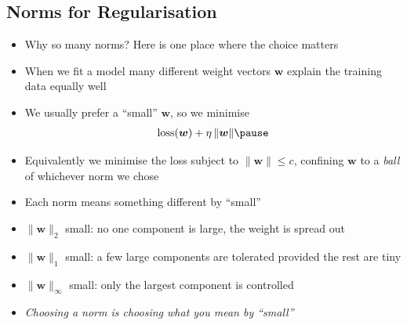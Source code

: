 \begin{slide}
\section[-2]{Norms for Regularisation}

\begin{PauseHighLight}\small
  \begin{itemize}\squeeze
  \item Why so many norms?  Here is one place where the choice
    matters\pause
  \item When we fit a model many different weight vectors $\bm{w}$
    explain the training data equally well\pause
  \item We usually prefer a ``small'' $\bm{w}$, so we minimise
    \begin{align*}
      \mathrm{loss}(\bm{w}) + \eta \, \| \bm{w} \|\pause
    \end{align*}
  \item Equivalently we minimise the loss subject to $\| \bm{w} \|\leq
    c$, confining $\bm{w}$ to a \emph{ball} of whichever norm we
    chose\pause
  \item Each norm means something different by ``small''\pause
  \item $\| \bm{w} \|_2$ small: no one component is large, the weight
    is spread out\pause
  \item $\| \bm{w} \|_1$ small: a few large components are tolerated
    provided the rest are tiny\pause
  \item $\| \bm{w} \|_{\infty}$ small: only the largest component is
    controlled\pause
  \item \emph{Choosing a norm is choosing what you mean by
    ``small''}\pause
  \end{itemize}
\end{PauseHighLight}

\end{slide}


